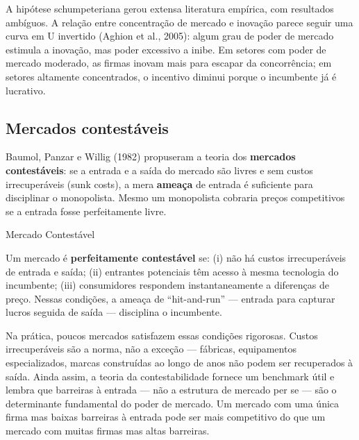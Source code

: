 \documentclass[11pt,twoside,openright]{book}
\begin{document}
A hipótese schumpeteriana gerou extensa literatura empírica, com
resultados ambíguos. A relação entre concentração de mercado e inovação
parece seguir uma curva em U invertido (Aghion et al., 2005): algum grau
de poder de mercado estimula a inovação, mas poder excessivo a inibe. Em
setores com poder de mercado moderado, as firmas inovam mais para
escapar da concorrência; em setores altamente concentrados, o incentivo
diminui porque o incumbente já é lucrativo.

\subsection{Mercados contestáveis}\label{mercados-contestuxe1veis}

Baumol, Panzar e Willig (1982) propuseram a teoria dos \textbf{mercados
contestáveis}: se a entrada e a saída do mercado são livres e sem custos
irrecuperáveis (sunk costs), a mera \textbf{ameaça} de entrada é
suficiente para disciplinar o monopolista. Mesmo um monopolista cobraria
preços competitivos se a entrada fosse perfeitamente livre.

\begin{definitionbox}{Mercado Contestável}

Um mercado é \textbf{perfeitamente contestável} se: (i) não há custos
irrecuperáveis de entrada e saída; (ii) entrantes potenciais têm acesso
à mesma tecnologia do incumbente; (iii) consumidores respondem
instantaneamente a diferenças de preço. Nessas condições, a ameaça de
``hit-and-run'' --- entrada para capturar lucros seguida de saída ---
disciplina o incumbente.

\end{definitionbox}

Na prática, poucos mercados satisfazem essas condições rigorosas. Custos
irrecuperáveis são a norma, não a exceção --- fábricas, equipamentos
especializados, marcas construídas ao longo de anos não podem ser
recuperados à saída. Ainda assim, a teoria da contestabilidade fornece
um benchmark útil e lembra que barreiras à entrada --- não a estrutura
de mercado per se --- são o determinante fundamental do poder de
mercado. Um mercado com uma única firma mas baixas barreiras à entrada
pode ser mais competitivo do que um mercado com muitas firmas mas altas
barreiras.
\end{document}
